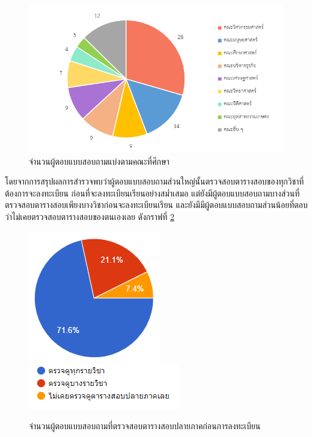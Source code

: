 \begin{figure}
  \begin{center}
    \includegraphics[width=\linewidth]{images/group_by_faculty.png}
  \end{center}
  \caption[จำนวนผู้ตอบแบบสอบถามแบ่งตามคณะที่ศึกษา]{จำนวนผู้ตอบแบบสอบถามแบ่งตามคณะที่ศึกษา}
  \label{fig:faculty}     
\end{figure}

โดยจากการสรุปผลการสำรวจพบว่าผู้ตอบแบบสอบถามส่วนใหญ่นั้นตรวจสอบตารางสอบของทุกวิชาที่ต้องการจะลงทะเบียน
ก่อนที่จะลงทะเบียนเรียนอย่างสม่ำเสมอ แต่ยังมีผู้ตอบแบบสอบถามบางส่วนที่ตรวจสอบตารางสอบเพียงบางวิชาก่อนจะลงทะเบียนเรียน และยังมีมีผู้ตอบแบบสอบถามส่วนน้อยที่ตอบว่าไม่เคยตรวจสอบตารางสอบของตนเองเลย ดังกราฟที่ \ref{fig:check_before_enrollment}
\begin{figure}
  \begin{center}
    \includegraphics{images/checking_schedule_before_enrollment.png}\\[2ex]
    \includegraphics{images/legend_for_checking_schedule_before_enrollment.png}
  \end{center}
  \caption[จำนวนผู้ตอบแบบสอบถามที่ตรวจสอบตารางสอบปลายภาคก่อนการลงทะเบียน]{จำนวนผู้ตอบแบบสอบถามที่ตรวจสอบตารางสอบปลายภาคก่อนการลงทะเบียน}
  \label{fig:check_before_enrollment}     
\end{figure}

